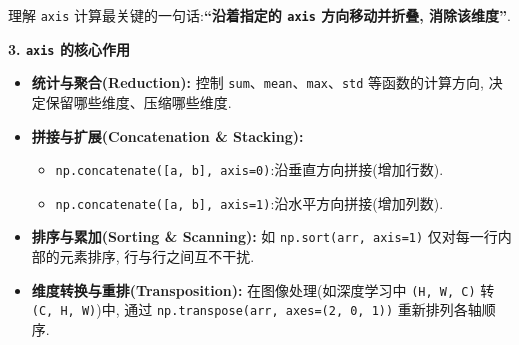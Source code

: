 \documentclass[11pt]{article}
\providecommand{\tightlist}{%
      \setlength{\itemsep}{0pt}\setlength{\parskip}{0pt}}
\begin{document}
理解 \texttt{axis} 计算最关键的一句话:\textbf{``沿着指定的 \texttt{axis}
方向移动并折叠, 消除该维度''}.

\textbf{3. \texttt{axis} 的核心作用}

\begin{itemize}
\tightlist
\item
  \textbf{统计与聚合(Reduction):} 控制
  \texttt{sum}、\texttt{mean}、\texttt{max}、\texttt{std}
  等函数的计算方向, 决定保留哪些维度、压缩哪些维度.
\item
  \textbf{拼接与扩展(Concatenation \& Stacking):}

  \begin{itemize}
  \tightlist
  \item
    \texttt{np.concatenate({[}a,\ b{]},\ axis=0)}:沿垂直方向拼接(增加行数).
  \item
    \texttt{np.concatenate({[}a,\ b{]},\ axis=1)}:沿水平方向拼接(增加列数).
  \end{itemize}
\item
  \textbf{排序与累加(Sorting \& Scanning):} 如
  \texttt{np.sort(arr,\ axis=1)} 仅对每一行内部的元素排序,
  行与行之间互不干扰.
\item
  \textbf{维度转换与重排(Transposition):} 在图像处理(如深度学习中
  \texttt{(H,\ W,\ C)} 转 \texttt{(C,\ H,\ W)})中, 通过
  \texttt{np.transpose(arr,\ axes=(2,\ 0,\ 1))} 重新排列各轴顺序.
\end{itemize}
\end{document}

